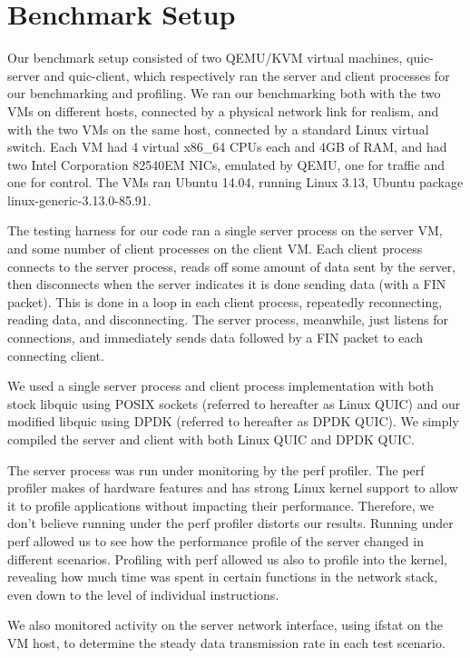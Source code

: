 \documentclass{sig-alternate-05-2015}
\begin{document}
\section{Benchmark Setup}
Our benchmark setup consisted of two QEMU/KVM virtual machines,
quic-server and quic-client,
which respectively ran the server and client processes for our benchmarking and profiling.
We ran our benchmarking both with the two VMs on different hosts,
connected by a physical network link for realism,
and with the two VMs on the same host, connected by a standard Linux virtual switch.
Each VM had 4 virtual x86\_64 CPUs each and 4GB of RAM,
and had two Intel Corporation 82540EM NICs, emulated by QEMU,
one for traffic and one for control.
The VMs ran Ubuntu 14.04,
running Linux 3.13,
Ubuntu package linux-generic-3.13.0-85.91.

The testing harness for our code ran a single server process on the server VM,
and some number of client processes on the client VM.
Each client process connects to the server process,
reads off some amount of data sent by the server,
then disconnects when the server indicates it is done sending data (with a FIN packet).
This is done in a loop in each client process, repeatedly reconnecting, reading data, and disconnecting.
The server process, meanwhile, just listens for connections,
and immediately sends data followed by a FIN packet to each connecting client.

We used a single server process and client process implementation with both 
stock libquic using POSIX sockets
(referred to hereafter as Linux QUIC)
and our modified libquic using DPDK
(referred to hereafter as DPDK QUIC).
We simply compiled the server and client with both Linux QUIC and DPDK QUIC.

The server process was run under monitoring by the perf profiler.
The perf profiler makes of hardware features and has strong Linux kernel support
to allow it to profile applications without impacting their performance.
Therefore, we don't believe running under the perf profiler distorts our results.
Running under perf allowed us to see how the performance profile of the server changed in different scenarios.
Profiling with perf allowed us also to profile into the kernel,
revealing how much time was spent in certain functions in the network stack,
even down to the level of individual instructions.

We also monitored activity on the server network interface,
using ifstat on the VM host,
to determine the steady data transmission rate in each test scenario.
\end{document}
